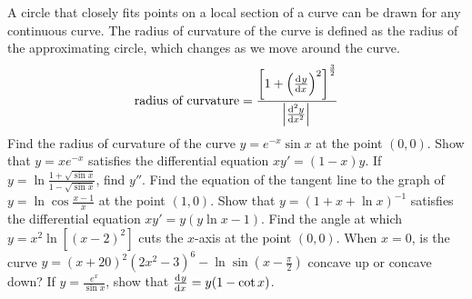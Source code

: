 \begin{questions}
  \questioE A circle that closely fits points on a local section of a curve can be drawn for any continuous curve. The
            radius of curvature of the curve is defined as the radius of the approximating circle, which changes as
            we move around the curve.
            \begin{displaymath}
              \textrm{radius of curvature} = \frac{\left[1 +  \left(\od{y}{x}\right)^2 \right]^{\frac{3}{2}}}{\abs{\od[2]{y}{x}}}
            \end{displaymath}
            Find the radius of curvature of the curve $ y = e^{-x} \sin x $ at the point $ (0, 0) $.
  \questioM Show that $ y = xe^{-x} $ satisfies the differential equation $ xy' = (1-x)y $.
  \questioM If $ y = \ln \frac{1 + \sqrt{\sin x}}{1 - \sqrt{\sin x}} $, find $ y'' $.
  \questioM Find the equation of the tangent line to the graph of $ y = \ln \cos \frac{x - 1}{x} $ at
            the point $(1, 0)$.
  \questioM Show that $ y = (1 + x + \ln x)^{-1} $ satisfies the differential equation $ xy' = y(y \ln x - 1) $.
  \questioE Find the angle at which $ y = x^2 \ln [(x - 2)^2] $ cuts the $ x$-axis at the point $ (0,0) $.
  \questioM When $ x = 0 $, is the curve $ y = (x + 20)^2 (2x^2 - 3)^6 - \ln \sin (x - \frac{\pi}{2}) $ concave up or concave down?
  \questioM If $ y = \frac{e^x}{\sin x} $, show that $ \od{y}{x} = y(1 - \cot x) $.
\end{questions}

